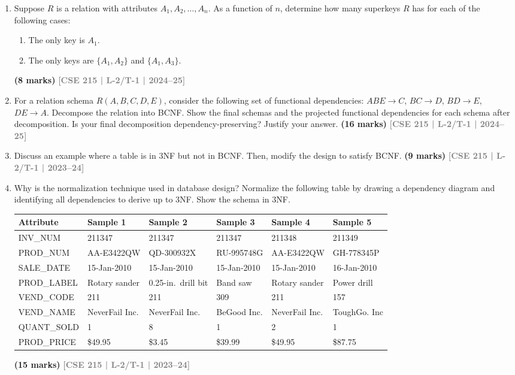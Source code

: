 \documentclass[12pt,a3paper]{article}
\newcommand{\yr}[1]{\hfill\textcolor{gray}{\small\textbf{[#1]}}}
\newcommand{\mk}[1]{\textcolor{orange!70!black}{\small\textbf{(#1 marks)}}}
\begin{document}
\begin{enumerate}

\item Suppose $R$ is a relation with attributes $A_1, A_2, \ldots, A_n$. As a function of $n$, determine how many superkeys $R$ has for each of the following cases:
\begin{enumerate}
  \item The only key is $A_1$.
  \item The only keys are $\{A_1, A_2\}$ and $\{A_1, A_3\}$.
\end{enumerate}
\mk{8} \yr{CSE 215 | L-2/T-1 | 2024--25}

\item For a relation schema $R(A,B,C,D,E)$, consider the following set of functional dependencies: $ABE \to C$, $BC \to D$, $BD \to E$, $DE \to A$. Decompose the relation into BCNF. Show the final schemas and the projected functional dependencies for each schema after decomposition. Is your final decomposition dependency-preserving? Justify your answer.
\mk{16} \yr{CSE 215 | L-2/T-1 | 2024--25}

\item Discuss an example where a table is in 3NF but not in BCNF. Then, modify the design to satisfy BCNF.
\mk{9} \yr{CSE 215 | L-2/T-1 | 2023--24}

\item Why is the normalization technique used in database design? Normalize the following table by drawing a dependency diagram and identifying all dependencies to derive up to 3NF. Show the schema in 3NF.

\medskip
\begin{center}
\small
\begin{tabular}{llllll}
\toprule
\textbf{Attribute} & \textbf{Sample 1} & \textbf{Sample 2} & \textbf{Sample 3} & \textbf{Sample 4} & \textbf{Sample 5}\\
\midrule
INV\_NUM    & 211347 & 211347 & 211347 & 211348 & 211349\\
PROD\_NUM   & AA-E3422QW & QD-300932X & RU-995748G & AA-E3422QW & GH-778345P\\
SALE\_DATE  & 15-Jan-2010 & 15-Jan-2010 & 15-Jan-2010 & 15-Jan-2010 & 16-Jan-2010\\
PROD\_LABEL & Rotary sander & 0.25-in.\ drill bit & Band saw & Rotary sander & Power drill \\
VEND\_CODE  & 211 & 211 & 309 & 211 & 157\\
VEND\_NAME  & NeverFail Inc. & NeverFail Inc. & BeGood Inc. & NeverFail Inc. & ToughGo. Inc\\
QUANT\_SOLD & 1 & 8 & 1 & 2 & 1\\
PROD\_PRICE & \$49.95 & \$3.45 & \$39.99 & \$49.95 & \$87.75\\
\bottomrule
\end{tabular}
\end{center}
\mk{15} \yr{CSE 215 | L-2/T-1 | 2023--24}


\end{enumerate}
\end{document}
